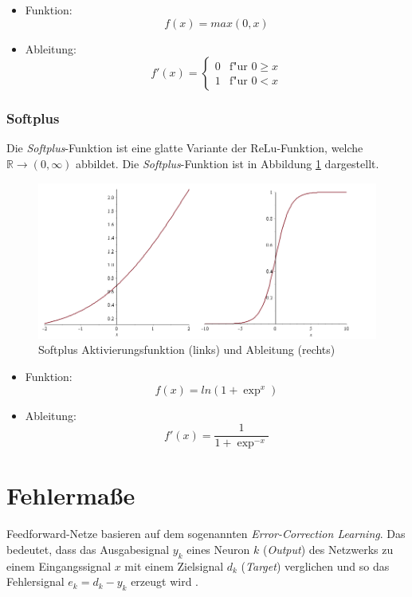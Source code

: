    \begin{itemize}
   \item Funktion: 
   			\begin{equation} 
   			f(x) =  max(0,x) 
   			\end{equation}
   \item Ableitung: 
   		\begin{equation}
   		   f'(x) =
   		   \begin{cases}
   		     0 & \text{f"ur } 0 \ge x  \\
   		     1 & \text{f"ur } 0 < x
   		     \end{cases}
   		\end{equation}
   \end{itemize}
 

\subsubsection{Softplus}
Die \textit{Softplus}-Funktion ist eine glatte Variante der ReLu-Funktion, welche
 $\mathbb{R} \rightarrow (0,\infty) $ abbildet. Die \textit{Softplus}-Funktion ist in Abbildung \ref{fig:2_sofplus} dargestellt.

 \begin{figure}[H]
 \centering
 \includegraphics[width=0.6\linewidth]{images/2_softplus}
 \caption[Softplus Aktivierungsfunktion und Ableitung]{Softplus Aktivierungsfunktion (links) und Ableitung (rechts)}
 \label{fig:2_sofplus}
 \end{figure}

 
   \begin{itemize}
   \item Funktion:  
   		\begin{equation} 
   		f(x) =  ln(1+\exp^x) 
   		\end{equation}
   \item Ableitung: 
   	\begin{equation} 
   	f'(x) = \frac{1}{1+\exp^{-x}}
   	\end{equation}
   \end{itemize}

\section{Fehlermaße}
Feedforward-Netze basieren auf dem sogenannten \textit{Error-Correction Learning}. Das bedeutet, dass das Ausgabesignal $y_k$ eines Neuron $k$ (\textit{Output}) des Netzwerks zu einem Eingangssignal $x$ mit einem Zielsignal $d_k$ (\textit{Target})  verglichen und so das Fehlersignal $e_k = d_k - y_k$ erzeugt wird \cite[vgl.][S. 51f]{Haykin1999}.

